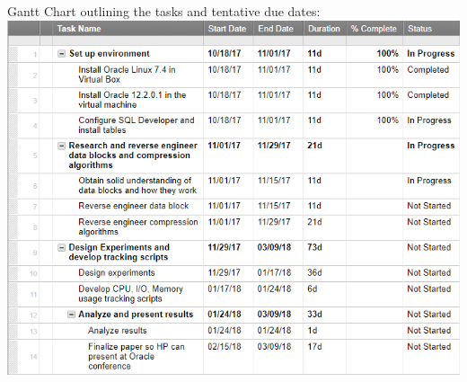 \documentclass[10pt]{article}
\begin{document}
Gantt Chart outlining the tasks and tentative due dates: \\
\includegraphics{gantt.png}
\end{document}
